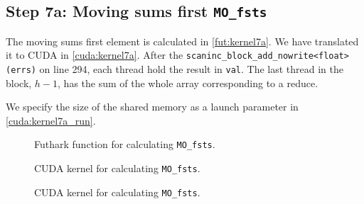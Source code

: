 \subsection{
    Step 7a: Moving sums first \texttt{MO\_fsts}
}

The moving sums first element is calculated in \autoref{fut:kernel7a}. We have
translated it to CUDA in \autoref{cuda:kernel7a}. 
After the \texttt{scaninc\_block\_add\_nowrite<float>(errs)} on line 294, each
thread hold the result in \texttt{val}. The last thread in the block, \(h-1\), has the sum of
the whole array corresponding to a reduce.

We specify the size of the
shared memory as a launch parameter in \autoref{cuda:kernel7a_run}. 


\begin{figure}[H]
    \centering
    \caption{Futhark function for calculating \texttt{MO\_fsts}.}
    \label{fut:kernel7a}
\end{figure}


\begin{figure}[H]
    \centering
    \caption{CUDA kernel for calculating  \texttt{MO\_fsts}.}
    \label{cuda:kernel7a}
\end{figure}

\begin{figure}[H]
    \centering
    \caption{CUDA kernel for calculating  \texttt{MO\_fsts}.}
    \label{cuda:kernel7a_run}
\end{figure}

